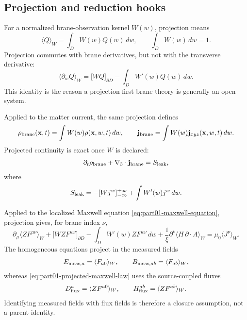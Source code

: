 \subsection{Projection and reduction hooks}
\label{subsec:part01-projection-hooks}

For a normalized brane-observation kernel \(W(w)\), projection means
\begin{equation}
\label{eq:part01-projection-operator}
\langle Q\rangle_W=\int_D W(w)Q(w)\,dw,
\qquad
\int_DW(w)\,dw=1.
\end{equation}
Projection commutes with brane derivatives, but not with the transverse
derivative:
\begin{equation}
\label{eq:part01-projection-ibp}
\langle \partial_w Q\rangle_W
=\bigl[WQ\bigr]_{\partial D}-\int_DW'(w)Q(w)\,dw.
\end{equation}
This identity is the reason a projection-first brane theory is generally an
open system.

Applied to the matter current, the same projection defines
\begin{equation}
\rho_{\rm brane}(\mathbf x,t)=\int W(w)\rho(\mathbf x,w,t)\,dw,
\qquad
\mathbf j_{\rm brane}=\int W(w)\mathbf j_{xyz}(\mathbf x,w,t)\,dw.
\end{equation}
Projected continuity is exact once \(W\) is declared:
\begin{equation}
\label{eq:part01-projected-continuity}
\partial_t\rho_{\rm brane}+\nabla_3\cdot\mathbf j_{\rm brane}=S_{\rm leak},
\end{equation}
where
\begin{equation}
\label{eq:part01-leakage-source}
S_{\rm leak}
=-[Wj^w]_{-\infty}^{+\infty}+\int W'(w)j^w\,dw.
\end{equation}

Applied to the localized Maxwell equation \eqref{eq:part01-maxwell-equation},
projection gives, for brane index \(\nu\),
\begin{equation}
\label{eq:part01-projected-maxwell-law}
\boxed{
\partial_\mu\langle ZF^{\mu\nu}\rangle_W
+\bigl[WZF^{w\nu}\bigr]_{\partial D}
-\int_DW'(w)ZF^{w\nu}\,dw
+\frac1\xi\partial^\nu\langle H\,\partial\!\cdot\!A\rangle_W
=\mu_0\langle J^\nu\rangle_W}.
\end{equation}
The homogeneous equations project in the measured fields
\begin{equation}
\label{eq:part01-measured-vs-flux-fields}
E_{{\rm meas},a}=\langle F_{a0}\rangle_W,
\qquad
B_{{\rm meas},ab}=\langle F_{ab}\rangle_W,
\end{equation}
whereas \eqref{eq:part01-projected-maxwell-law} uses the source-coupled fluxes
\begin{equation}
D_{\rm flux}^{a}=\langle ZF^{a0}\rangle_W,
\qquad
H_{\rm flux}^{ab}=\langle ZF^{ab}\rangle_W.
\end{equation}
Identifying measured fields with flux fields is therefore a closure assumption,
not a parent identity.

